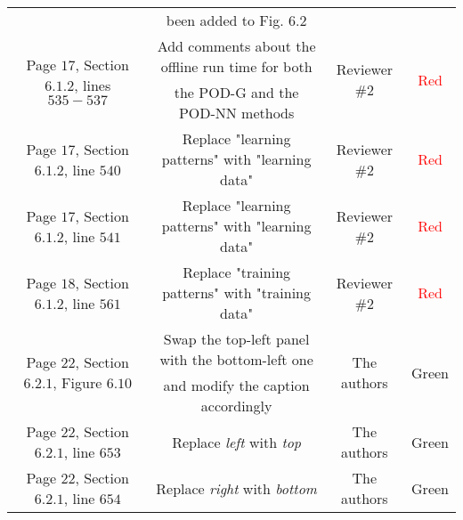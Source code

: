 \documentclass[longtitle]{elsarticle}
\theoremstyle{theorem}
\theoremstyle{definition}
\theoremstyle{remark}
\theoremstyle{proposition}
\numberwithin{figure}{section}
\begin{document}
\begin{longtable}{c|c|c|c}
		\multicolumn{1}{|c|}{} &
		\multicolumn{1}{c|}{been added to Fig. $6.2$} &
		\multicolumn{1}{c|}{} &
		\multicolumn{1}{c|}{} \\[0.1cm]
		\cline{1-4}
		\multicolumn{1}{|c|}{\multirow{2}{*}{Page $17$, Section $6.1.2$, lines $535-537$}} & 
		\multicolumn{1}{c|}{Add comments about the offline run time for both} &
		\multicolumn{1}{c|}{\multirow{2}{*}{Reviewer \#2}} &
		\multicolumn{1}{c|}{\multirow{2}{*}{\textcolor{red}{Red}}} \\[-0.1cm]
		\multicolumn{1}{|c|}{} &
		\multicolumn{1}{c|}{the POD-G and the POD-NN methods} &
		\multicolumn{1}{c|}{} &
		\multicolumn{1}{c|}{} \\[0.1cm]
		\cline{1-4}
		\multicolumn{1}{|c|}{Page $17$, Section $6.1.2$, line $540$} & 
		\multicolumn{1}{c|}{Replace "learning patterns" with "learning data"} &
		\multicolumn{1}{c|}{Reviewer \#2} &
		\multicolumn{1}{c|}{\textcolor{red}{Red}} \\
		\cline{1-4}
		\multicolumn{1}{|c|}{Page $17$, Section $6.1.2$, line $541$} & 
		\multicolumn{1}{c|}{Replace "learning patterns" with "learning data"} &
		\multicolumn{1}{c|}{Reviewer \#2} &
		\multicolumn{1}{c|}{\textcolor{red}{Red}} \\
		\cline{1-4}
		\multicolumn{1}{|c|}{Page $18$, Section $6.1.2$, line $561$} & 
		\multicolumn{1}{c|}{Replace "training patterns" with "training data"} &
		\multicolumn{1}{c|}{Reviewer \#2} &
		\multicolumn{1}{c|}{\textcolor{red}{Red}} \\
		\cline{1-4}
		\multicolumn{1}{|c|}{\multirow{2}{*}{Page $22$, Section $6.2.1$, Figure $6.10$}} & 
		\multicolumn{1}{c|}{Swap the top-left panel with the bottom-left one} &
		\multicolumn{1}{c|}{\multirow{2}{*}{The authors}} &
		\multicolumn{1}{c|}{\multirow{2}{*}{\textcolor{deepgreen}{Green}}} \\[-0.1cm]
		\multicolumn{1}{|c|}{} &
		\multicolumn{1}{c|}{and modify the caption accordingly} &
		\multicolumn{1}{c|}{} &
		\multicolumn{1}{c|}{} \\[0.1cm]
		\cline{1-4}
		\multicolumn{1}{|c|}{Page $22$, Section $6.2.1$, line $653$} & 
		\multicolumn{1}{c|}{Replace \emph{left} with \emph{top}} &
		\multicolumn{1}{c|}{The authors} &
		\multicolumn{1}{c|}{\textcolor{deepgreen}{Green}} \\
		\cline{1-4}
		\multicolumn{1}{|c|}{Page $22$, Section $6.2.1$, line $654$} & 
		\multicolumn{1}{c|}{Replace \emph{right} with \emph{bottom}} &
		\multicolumn{1}{c|}{The authors} &
		\multicolumn{1}{c|}{\textcolor{deepgreen}{Green}} \\

\end{longtable}
\end{document}
